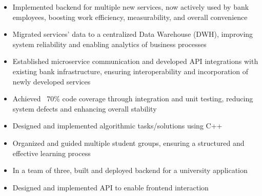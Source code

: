 \documentclass[10pt,a4paper,ragged2e,withhyper]{altacv}
\begin{document}
\begin{paracol}{2}


\begin{itemize}
  \item Implemented backend for multiple new services, now actively used by bank employees, boosting work efficiency, measurability, and overall convenience
  \item Migrated services' data to a centralized Data Warehouse (DWH), improving system reliability and enabling analytics of business processes
  \item Established microservice communication and developed API integrations with existing bank infrastructure, ensuring interoperability and incorporation of newly developed services
  \item Achieved ~70\% code coverage through integration and unit testing, reducing system defects and enhancing overall stability
\end{itemize}


\begin{itemize}
  \item Designed and implemented algorithmic tasks/solutions using C++
  \item Organized and guided multiple student groups, ensuring a structured and effective learning process
\end{itemize}

\divider

\begin{itemize}
  \item In a team of three, built and deployed backend for a university application
  \item Designed and implemented API to enable frontend interaction
\end{itemize}

\divider



\end{paracol}
\end{document}
